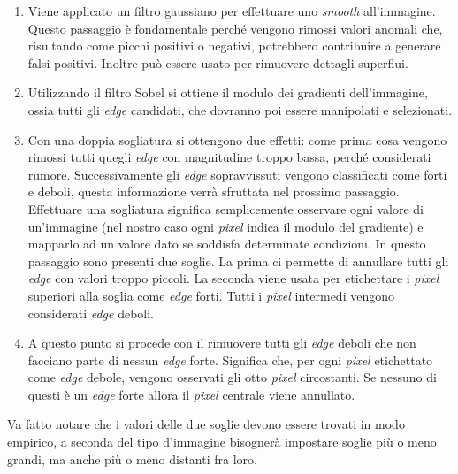 \begin{enumerate}
  \item Viene applicato un filtro gaussiano per effettuare uno \textit{smooth} all'immagine.
    Questo passaggio è fondamentale perché vengono rimossi valori anomali che, risultando come picchi positivi o negativi, potrebbero contribuire a generare falsi positivi.
    Inoltre può essere usato per rimuovere dettagli superflui.

  \item Utilizzando il filtro Sobel si ottiene il modulo dei gradienti dell'immagine, ossia tutti gli \textit{edge} candidati, che dovranno poi essere manipolati e selezionati.


  \item Con una doppia sogliatura si ottengono due effetti:
    come prima cosa vengono rimossi tutti quegli \textit{edge} con magnitudine troppo bassa, perché considerati rumore.
    Successivamente gli \textit{edge} sopravvissuti vengono classificati come forti e deboli, questa informazione verrà sfruttata nel prossimo passaggio.
    Effettuare una sogliatura significa semplicemente osservare ogni valore di un'immagine (nel nostro caso ogni \textit{pixel} indica il modulo del gradiente) e mapparlo ad un valore dato se soddisfa determinate condizioni.
    In questo passaggio sono presenti due soglie.
    La prima ci permette di annullare tutti gli \textit{edge} con valori troppo piccoli.
    La seconda viene usata per etichettare i \textit{pixel} superiori alla soglia come \textit{edge} forti.
    Tutti i \textit{pixel} intermedi vengono considerati \textit{edge} deboli.

  \item A questo punto si procede con il rimuovere tutti gli \textit{edge} deboli che non facciano parte di nessun \textit{edge} forte.
    Significa che, per ogni \textit{pixel} etichettato come \textit{edge} debole, vengono osservati gli otto \textit{pixel} circostanti.
    Se nessuno di questi è un \textit{edge} forte allora il \textit{pixel} centrale viene annullato.

\end{enumerate}
Va fatto notare che i valori delle due soglie devono essere trovati in modo empirico, a seconda del tipo d'immagine bisognerà impostare soglie più o meno grandi, ma anche più o meno distanti fra loro.

